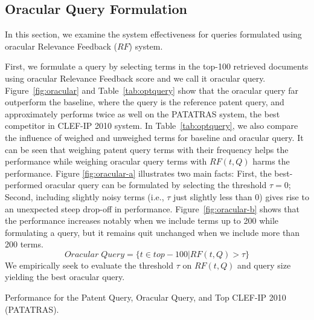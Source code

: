 \subsection{Oracular Query Formulation}
\label{sec:OracularQueryFormulation}
In this section, we examine the system effectiveness for queries formulated using oracular Relevance Feedback ($\mathit{RF}$) system.

First, we formulate a query by selecting terms in the top-100 retrieved documents using oracular Relevance Feedback score and we call it oracular query. 
Figure~\ref{fig:oracular} and Table~\ref{tab:optquery} show that the oracular query far outperform the baseline, where the query is the reference patent query, and approximately performs twice as well on the PATATRAS system, the best competitor in CLEF-IP 2010 system. In Table~\ref{tab:optquery}, we also compare the influence of weighed and unweighed terms for baseline and oracular query. It can be seen that weighing patent query terms with their frequency helps the performance while weighing oracular query terms with $RF(t, Q)$ harms the performance.  Figure \ref{fig:oracular-a} illustrates two main facts: First, the best-performed oracular query can be formulated by selecting the threshold $\tau=0$; Second, including slightly noisy terms (i.e., $\tau$ just slightly less than 0) gives rise to an unexpected steep drop-off in performance. Figure~\ref{fig:oracular-b} shows that the performance increases notably when we include terms up to 200 while formulating a query, but it remains quit unchanged when we include more than 200 terms. 
\begin{equation}
Oracular \; Query = \{t \in top-100|RF(t, Q)>\tau\}   
 \label{eq:score}
\end{equation}
We empirically seek to evaluate the threshold $\tau$ on $RF(t,Q)$ and query size yielding the best oracular query.
\begin{table}[t!]
  \begin{center}
  \scriptsize
   \caption{Performance for the Patent Query, Oracular Query, and Top CLEF-IP 2010 (PATATRAS).}
   \vspace*{1ex}
     
  \label{tab:optquery}
  \end{center}  
\end{table}
